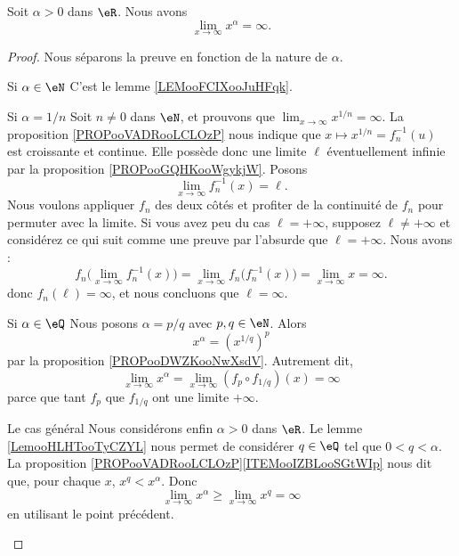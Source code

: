\begin{proposition}     \label{PROPooJRWCooGiXAYt}
    Soit \( \alpha>0\) dans \( \eR\). Nous avons
    \begin{equation}
        \lim_{x\to \infty} x^{\alpha}=\infty.
    \end{equation}
\end{proposition}

\begin{proof}
    Nous séparons la preuve en fonction de la nature de \( \alpha\).
    \begin{subproof}
    \item[Si \( \alpha\in \eN\)]
        C'est le lemme \ref{LEMooFCIXooJuHFqk}.
    \item[Si \( \alpha=1/n\)]
        Soit \( n\neq 0\) dans \( \eN\), et prouvons que \( \lim_{x\to \infty} x^{1/n}=\infty\). La proposition \ref{PROPooVADRooLCLOzP} nous indique que \( x\mapsto x^{1/n}=f_n^{-1}(u)\) est croissante et continue. Elle possède donc une limite \( \ell\) éventuellement infinie par la proposition \ref{PROPooGQHKooWgykjW}. Posons
        \begin{equation}
            \lim_{x\to \infty} f_n^{-1}(x)=\ell.
        \end{equation}
        Nous voulons appliquer \( f_n\) des deux côtés et profiter de la continuité de \( f_n\) pour permuter avec la limite. Si vous avez peu du cas \( \ell=+\infty\), supposez \( \ell\neq +\infty\) et considérez ce qui suit comme une preuve par l'absurde que \( \ell=+\infty\). Nous avons :
        \begin{equation}
            f_n\big( \lim_{x\to \infty} f_n^{-1}(x) \big)=\lim_{x\to \infty} f_n\big( f_n^{-1}(x) \big)=\lim_{x\to \infty} x=\infty.
        \end{equation}
        donc \( f_n(\ell)=\infty\), et nous concluons que \( \ell=\infty\).
    \item[Si \( \alpha\in \eQ\)]
        Nous posons \( \alpha=p/q\) avec \( p,q\in \eN\). Alors
        \begin{equation}
            x^{\alpha}=(x^{1/q})^p
        \end{equation}
        par la proposition \ref{PROPooDWZKooNwXsdV}. Autrement dit,
        \begin{equation}
            \lim_{x\to \infty} x^{\alpha}=\lim_{x\to \infty} (f_p\circ f_{1/q})(x)=\infty
        \end{equation}
        parce que tant \( f_p\) que \( f_{1/q}\) ont une limite \( +\infty\).
    \item[Le cas général] 
        Nous considérons enfin \( \alpha>0\) dans \( \eR\). Le lemme \ref{LemooHLHTooTyCZYL} nous permet de considérer \( q\in \eQ\) tel que \( 0<q<\alpha\). La proposition \ref{PROPooVADRooLCLOzP}\ref{ITEMooIZBLooSGtWIp} nous dit que, pour chaque \( x\), \( x^q<x^{\alpha}\). Donc
        \begin{equation}
            \lim_{x\to \infty} x^{\alpha}\geq \lim_{x\to \infty} x^q=\infty
        \end{equation}
        en utilisant le point précédent.
    \end{subproof}
\end{proof}

